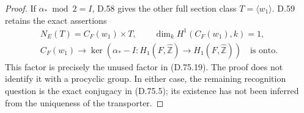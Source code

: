 \begin{proof}
If $\alpha_*\bmod2=I$, D.58 gives the other
full section class $T=\langle w_1\rangle$.
D.59 retains the exact assertions
\[
 \begin{gathered}
 N_E(T)=C_F(w_1)\times T,\qquad
             \dim_k H^1(C_F(w_1),k)=1,\\
 C_F(w_1)\longrightarrow
       \ker(\alpha_*-I:H_1(F,\widehat{\mathbb Z})
                            \to H_1(F,\widehat{\mathbb Z}))
                  \quad\text{is onto}.
 \end{gathered}                                             \tag{D.75.27}
\]
This factor is precisely the unused factor
in (D.75.19).  The proof does not identify
it with a procyclic group.  In either case,
the remaining recognition question is the
exact conjugacy in (D.75.5); its existence
has not been inferred from the uniqueness
of the transporter.
\end{proof}
